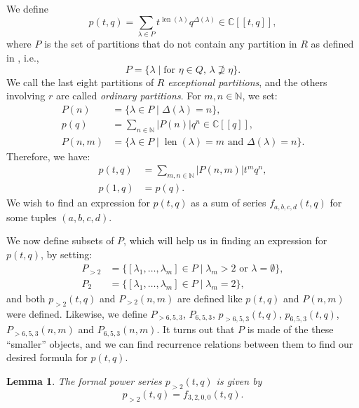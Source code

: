 \documentclass[a4paper, 12pt, reqno]{amsart}
\newtheorem{lemma}[theorem]{Lemma}
\theoremstyle{remark}
\DeclareMathOperator{\len}{len}
\begin{document}
We define
\begin{equation*}
  p(t, q) = \sum_{\lambda \in P}t^{\len(\lambda)}q^{\Delta(\lambda)} \in \mathbb{C}[[t, q]],
\end{equation*}
where $P$ is the set of partitions that do not contain any partition in $R$ as defined in , i.e.,
\begin{equation*}
  P = \{\lambda \mid \text{for $\eta \in Q$, $\lambda \nsupseteq \eta$}\}.
\end{equation*}
We call the last eight partitions of $R$ \emph{exceptional partitions}, and the others involving $r$ are called \emph{ordinary partitions}.
For $m, n \in \mathbb{N}$, we set:
\begin{align*}
  P(n) &= \{\lambda \in P \mid \Delta(\lambda) = n\}, \\
  p(q) &= \sum_{n \in \mathbb{N}}|P(n)|q^n \in \mathbb{C}[[q]], \\
  P(n, m) &= \{\lambda \in P \mid \text{$\len(\lambda) = m$ and $\Delta(\lambda) = n$}\}.
\end{align*}
Therefore, we have:
\begin{align*}
  p(t, q) &= \sum_{m, n \in \mathbb{N}}|P(n, m)|t^mq^n, \\
  p(1, q) &= p(q).
\end{align*}
We wish to find an expression for $p(t, q)$ as a sum of series $f_{a, b, c, d}(t, q)$ for some tuples $(a, b, c, d)$.

We now define subsets of $P$, which will help us in finding an expression for $p(t, q)$, by setting:
\begin{align*}
  P_{>2} &= \{[\lambda_1, \dots, \lambda_m] \in P \mid \text{$\lambda_m > 2$ or $\lambda = \emptyset$}\}, \\
  P_2 &= \{[\lambda_1, \dots, \lambda_m] \in P \mid \lambda_m = 2\},
\end{align*}
and both $p_{>2}(t, q)$ and $P_{>2}(n, m)$ are defined like $p(t, q)$ and $P(n, m)$ were defined.
Likewise, we define $P_{>6, 5, 3}$, $P_{6, 5, 3}$, $p_{>6, 5, 3}(t, q)$, $p_{6, 5, 3}(t, q)$, $P_{>6, 5, 3}(n, m)$ and $P_{6, 5, 3}(n, m)$.
It turns out that $P$ is made of the these ``smaller'' objects, and we can find recurrence relations between them to find our desired formula for $p(t, q)$.

\begin{lemma}
  \label{lmm:2}
  The formal power series $p_{>2}(t, q)$ is given by
  \begin{equation*}
    p_{>2}(t, q) = f_{3, 2, 0, 0}(t, q).
  \end{equation*}
\end{lemma}
\end{document}
